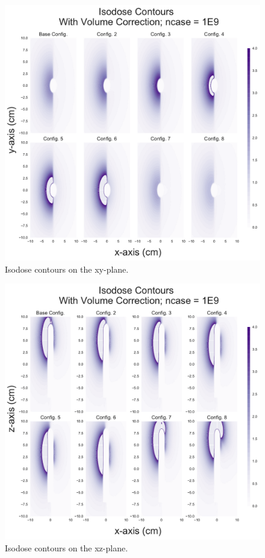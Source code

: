 \documentclass[12pt]{article}
\begin{document}
\begin{figure}[!ht]
	\centering
	\includegraphics[scale=0.6]{xy_isodose_profiles_180Shield}
	\caption{Isodose contours on the xy-plane.}
\end{figure}

\begin{figure}[!ht]
	\centering
	\includegraphics[scale=0.6]{xz_isodose_profiles_180Shield}
	\caption{Isodose contours on the xz-plane.}
\end{figure}
\end{document}
